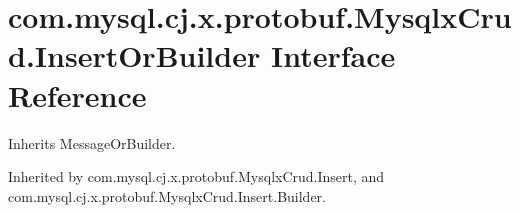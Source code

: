 \hypertarget{interfacecom_1_1mysql_1_1cj_1_1x_1_1protobuf_1_1_mysqlx_crud_1_1_insert_or_builder}{}\section{com.\+mysql.\+cj.\+x.\+protobuf.\+Mysqlx\+Crud.\+Insert\+Or\+Builder Interface Reference}
\label{interfacecom_1_1mysql_1_1cj_1_1x_1_1protobuf_1_1_mysqlx_crud_1_1_insert_or_builder}


Inherits Message\+Or\+Builder.



Inherited by com.\+mysql.\+cj.\+x.\+protobuf.\+Mysqlx\+Crud.\+Insert, and com.\+mysql.\+cj.\+x.\+protobuf.\+Mysqlx\+Crud.\+Insert.\+Builder.

